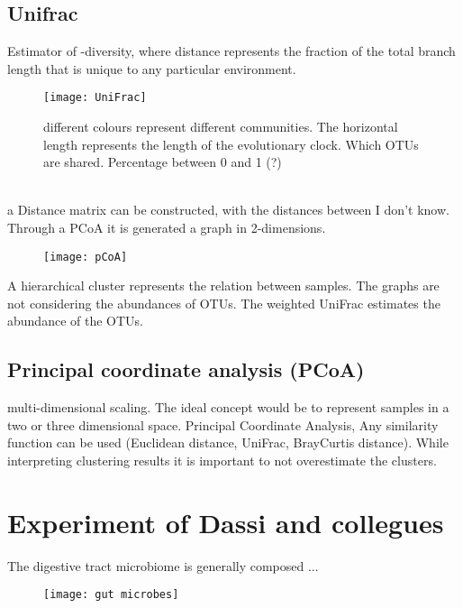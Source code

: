 \subsection{Unifrac}
Estimator of \beta -diversity, where distance represents the fraction of the total branch length that is unique to any particular environment.

\begin{figure}[h]
\caption{different colours represent different communities. The horizontal length represents the length of the evolutionary clock. Which OTUs are shared. Percentage between 0 and 1 (?)} %
\centering
\texttt{[image: UniFrac]}
\end{figure}

\\

a Distance matrix can be constructed, with the distances between I don't know. 
Through a PCoA it is generated a graph in 2-dimensions. 

\begin{figure}[h]
\caption{}
\centering
\texttt{[image: pCoA]}
\end{figure}

A hierarchical cluster represents the relation between samples. The graphs are not considering the abundances of OTUs. The weighted UniFrac estimates the abundance of the OTUs. 
\cite{lozuponeQuantitativeQualitativeBeta2007}

\subsection{Principal coordinate analysis (PCoA)}
multi-dimensional scaling. The ideal concept would be to represent samples in a two or three dimensional space. Principal Coordinate Analysis, Any similarity function can be used (Euclidean distance, UniFrac, BrayCurtis distance). While interpreting clustering results it is important to not overestimate the clusters. 

\section{Experiment of Dassi and collegues}



The digestive tract microbiome is generally composed ...
\begin{figure}[h]
\caption{}
\centering
\texttt{[image: gut microbes]}
\end{figure}


